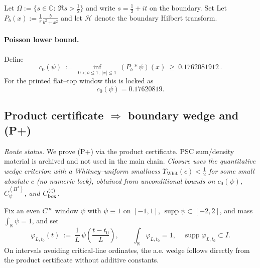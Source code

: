 \documentclass[11pt]{article}
\theoremstyle{definition}
\theoremstyle{remark}
\newcommand{\C}{\mathbb{C}}
\newcommand{\R}{\mathbb{R}}
\newcommand{\Poisson}{P}
\begin{document}
Let $\Omega:=\{s\in\C:\ \Re s>\tfrac12\}$ and write $s=\tfrac12+it$ on the boundary.
Set
Let $\Poisson_b(x):=\frac{1}{\pi}\frac{b}{b^2+x^2}$ and let $\mathcal H$ denote the boundary Hilbert transform.


\vspace{1.0cm}
\paragraph{Poisson lower bound.}
Define
\[
 c_0(\psi)\ :=\ \inf_{0<b\le 1,\ |x|\le 1}\ (\Poisson_{b}*\psi)(x)\ \ge\ 0.1762081912\,.
\]
For the printed flat--top window this is locked as
\[
  c_0(\psi)=0.17620819.
  \]






  

\vspace{1.0cm}
\subsection*{Product certificate $\Rightarrow$ boundary wedge and (P+)}
\noindent\textit{Route status.} We prove (P+) via the product certificate. PSC sum/density material is archived and not used in the main chain. \emph{Closure uses the quantitative wedge criterion with a Whitney–uniform smallness $\Upsilon_{\mathrm{Whit}}(c)<\tfrac12$ for some small absolute $c$ (no numeric lock), obtained from unconditional bounds on $c_0(\psi)$, $C_\psi^{(H^1)}$, and $C_{\rm box}^{(\zeta)}$.}

Fix an even $C^\infty$ window $\psi$ with $\psi\equiv 1$ on $[-1,1]$, $\operatorname{supp}\psi\subset[-2,2]$, and mass $\int_\R\psi=1$, and set
\[
  \varphi_{L,t_0}(t)\ :=\ \frac{1}{L}\,\psi\!\left(\frac{t-t_0}{L}\right),\qquad \int_{\R}\!\varphi_{L,t_0}=1,\quad \operatorname{supp}\varphi_{L,t_0}\subset I.
\]
On intervals avoiding critical-line ordinates, the a.e. wedge follows directly from the product certificate without additive constants.
\end{document}
